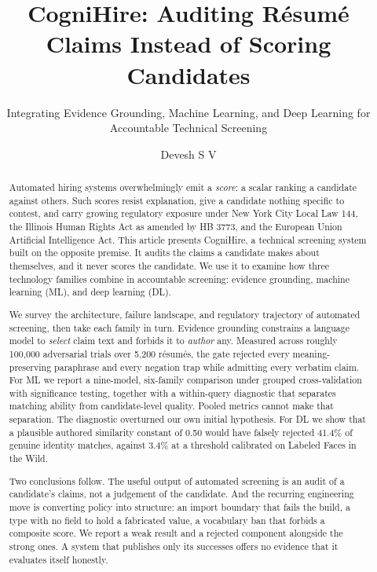 \documentclass[manuscript,screen,review=false]{acmart}
\begin{document}
\title{CogniHire: Auditing Résumé Claims Instead of Scoring Candidates}
\subtitle{Integrating Evidence Grounding, Machine Learning, and Deep Learning
for Accountable Technical Screening}

\author{Devesh S V}

\begin{abstract}
Automated hiring systems overwhelmingly emit a \emph{score}: a scalar ranking a
candidate against others. Such scores resist explanation, give a candidate
nothing specific to contest, and carry growing regulatory exposure under New York
City Local Law 144, the Illinois Human Rights Act as amended by HB 3773, and the
European Union Artificial Intelligence Act. This article presents CogniHire, a
technical screening system built on the opposite premise. It audits the claims a
candidate makes about themselves, and it never scores the candidate. We use it to
examine how three technology families combine in accountable screening: evidence
grounding, machine learning (ML), and deep learning (DL).

We survey the architecture, failure landscape, and regulatory trajectory of
automated screening, then take each family in turn. Evidence grounding constrains
a language model to \emph{select} claim text and forbids it to \emph{author} any.
Measured across roughly 100{,}000 adversarial trials over 5{,}200 résumés, the
gate rejected every meaning-preserving paraphrase and every negation trap while
admitting every verbatim claim. For ML we report a nine-model, six-family
comparison under grouped cross-validation with significance testing, together
with a within-query diagnostic that separates matching ability from
candidate-level quality. Pooled metrics cannot make that separation. The
diagnostic overturned our own initial hypothesis. For DL we show that a plausible
authored similarity constant of 0.50 would have falsely rejected 41.4\% of
genuine identity matches, against 3.4\% at a threshold calibrated on Labeled
Faces in the Wild.

Two conclusions follow. The useful output of automated screening is an audit of a
candidate's claims, not a judgement of the candidate. And the recurring
engineering move is converting policy into structure: an import boundary that
fails the build, a type with no field to hold a fabricated value, a vocabulary
ban that forbids a composite score. We report a weak result and a rejected
component alongside the strong ones. A system that publishes only its successes
offers no evidence that it evaluates itself honestly.
\end{abstract}
\end{document}
